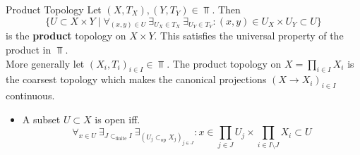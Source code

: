 \begin{definition}{Product Topology}{}
    Let $(X,T_X),(Y,T_Y)\in\Top$. Then \[
    \{U\subset X\times Y\mid \forall_{(x,y)\in U} \ \exists_{U_X\in T_X} \ \exists_{U_Y\in T_Y}:(x,y)\in U_X\times U_Y\subset U\}
    \]
    is the \textbf{product} topology on $X\times Y$. This satisfies the universal property of the product in $\Top$.\\

    More generally let $(X_i,T_i)_{i\in I}\in \Top$. The product topology on $X=\prod_{i\in I}X_i$ is the coarsest topology which makes the canonical projections $(X\to X_i)_{i\in I}$ continuous.
    \begin{itemize}
        \item A subset $U\subset X$ is open iff. \[\forall_{x\in U} \ \exists_{J\subset_{\text{finite}}I} \ \exists_{(U_j\subset_{\text{op}}X_j)_{j\in J}}:x\in \prod_{j\in J}U_j \times \prod_{i\in I\setminus J}X_i\subset U\]
    \end{itemize}
\end{definition}

